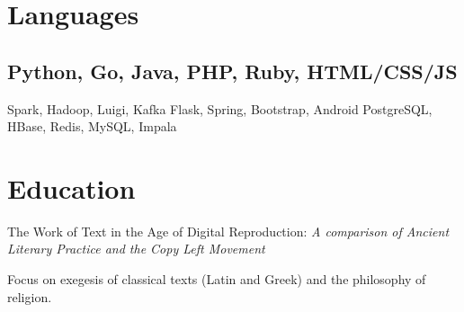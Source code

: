 \documentclass[]{deedy-resume-openfont}
\begin{document}
\section{Languages}
\subsection{Python, Go, Java, PHP, Ruby, HTML/CSS/JS}
Spark, Hadoop, Luigi, Kafka \textbullet{} Flask, Spring, Bootstrap, Android \textbullet{} PostgreSQL, HBase, Redis, MySQL, Impala
\sectionsep


\section{Education}
The Work of Text in the Age of Digital Reproduction:
\textit{A comparison of Ancient Literary Practice and the Copy Left Movement}
\sectionsep %

Focus on exegesis of classical texts (Latin and Greek) and the philosophy of religion.
\sectionsep
\end{document}
